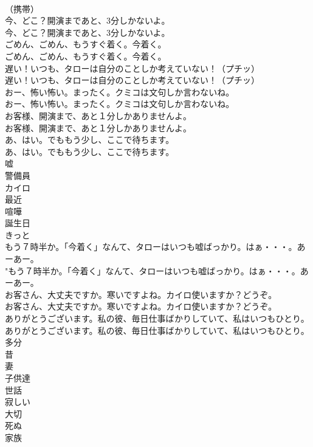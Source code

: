 \documentclass[8pt]{extreport}
\begin{document}
\begin{CJK}{UTF8}{min}
\\	（携帯）	
\\	今、どこ？開演まであと、3分しかないよ。	
\\	今、どこ？開演まであと、3分しかないよ。 
\\	ごめん、ごめん、もうすぐ着く。今着く。	
\\	ごめん、ごめん、もうすぐ着く。今着く。 
\\	遅い！いつも、タローは自分のことしか考えていない！（プチッ）	
\\	遅い！いつも、タローは自分のことしか考えていない！（プチッ） 
\\	おー、怖い怖い。まったく。クミコは文句しか言わないね。	
\\	おー、怖い怖い。まったく。クミコは文句しか言わないね。 
\\	お客様、開演まで、あと１分しかありませんよ。	
\\	お客様、開演まで、あと１分しかありませんよ。 
\\	あ、はい。でももう少し、ここで待ちます。	
\\	あ、はい。でももう少し、ここで待ちます。 
\\	嘘
\\	警備員
\\	カイロ
\\	最近
\\	喧嘩
\\	誕生日
\\	きっと
\\	もう７時半か。「今着く」なんて、タローはいつも嘘ばっかり。はぁ・・・。あーあー。	
\\	"もう７時半か。「今着く」なんて、タローはいつも嘘ばっかり。はぁ・・・。あーあー。 
\\	お客さん、大丈夫ですか。寒いですよね。カイロ使いますか？どうぞ。	
\\	お客さん、大丈夫ですか。寒いですよね。カイロ使いますか？どうぞ。 
\\	ありがとうございます。私の彼、毎日仕事ばかりしていて、私はいつもひとり。	
\\	ありがとうございます。私の彼、毎日仕事ばかりしていて、私はいつもひとり。 
\\	多分
\\	昔
\\	妻
\\	子供達
\\	世話
\\	寂しい
\\	大切
\\	死ぬ
\\	家族

\end{CJK}
\end{document}
